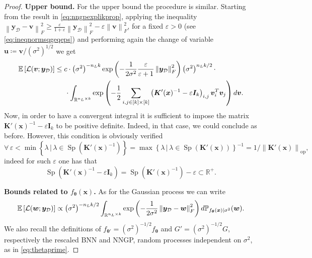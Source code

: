 \documentclass[a4paper, 11pt, reqno]{amsart}
\theoremstyle{plain}
\theoremstyle{remark}
\theoremstyle{definition}
\newcommand{\mean}[2][\kern-0.5pt]{\mathbb{E}_{#1}\left[#2\right]}
\newcommand{\given}{\, | \,}
\newcommand{\real}{\mathbb{R}}
\newcommand{\norm}[1]{\left\lVert#1\right\rVert}
\renewcommand{\exp}[1]{\operatorname{exp}\left(#1\right)}
\let\epsilon\varepsilon
\let\oldforall\forall
\renewcommand{\forall}{\oldforall\,}
\newcommand{\blankeq}{\kern14.65pt}
\begin{document}
\begin{proof}
	\textbf{Upper bound.} For the upper bound the procedure is similar.
	Starting from the result in \cref{eq:nngpexplikprop}, applying the inequality $\norm{\bm{y}_{\mathcal{D}} - \bm{v}}_F^2 \geq \frac{\epsilon}{1 + \epsilon} \norm{\bm{y}_{\mathcal{D}}}_F^2 - \epsilon \norm{\bm{v}}_F^2$, for a fixed $\epsilon > 0$ (see \cref{eq:ineqnormsqgeqeps}) and performing again the change of variable $\bm{u} \coloneqq \bm{v} / (\sigma^2)^{1/2}$ we get
	\begin{align*}
		\mean{\mathcal{L}(\bm{v}; \bm{y}_{\mathcal{D}})} & \leq c \cdot \left(\sigma^2\right)^{- n_L k} \exp{-\frac{1}{2 \sigma^2} \frac{\epsilon}{\epsilon + 1} \norm{\bm{y}_{\mathcal{D}}}_F^2} \left(\sigma^2\right)^{n_L k /2} \cdot \\
		& \blankeq \cdot \int_{\real^{n_L \times k}} \exp{-\frac{1}{2} \sum_{i, j \in [k] \times [k]} \left(\bm{K}'(\bm{x})^{-1} - \epsilon \bm{I}_k\right)_{i, j} \bm{v}_i^T \bm{v}_j} d\bm{v}.
	\end{align*}
	Now, in order to have a convergent integral it is sufficient to impose the matrix $\bm{K}'(\bm{x})^{-1} - \epsilon \bm{I}_k$ to be positive definite. Indeed, in that case, we could conclude as before. 
	However, this condition is obviously verified 
	\begin{equation*}
		\forall \epsilon < \min\left\{\lambda \given \lambda \in \operatorname{Sp}\left(\bm{K}'(\bm{x})^{-1}\right)\right\} = \max\left\{\lambda \given \lambda \in \operatorname{Sp}\left(\bm{K}'(\bm{x})\right)\right\}^{-1} = 1/\norm{\bm{K}'(\bm{x})}_{\mathrm{op}},
	\end{equation*}
	indeed for such $\epsilon$ one has that 
	\begin{equation*}
		\operatorname{Sp}\left(\bm{K}'(\bm{x})^{-1} - \epsilon \bm{I}_k\right) = \operatorname{Sp}\left(\bm{K}'(\bm{x})^{-1}\right) - \epsilon \subset \real^+.
	\end{equation*}
	
	\textbf{Bounds related to $f_{\bm{\theta}}(\bm{x})$.} As for the Gaussian process we can write 
	\begin{equation} \label{eq:nnexplikelihood}
		\mean{\mathcal{L}(\bm{w}; \bm{y}_{\mathcal{D}})} \propto \left(\sigma^2\right)^{- n_L k / 2} \int_{\real^{n_L \times k}} \exp{-\frac{1}{2\sigma^2} \norm{\bm{y}_{\mathcal{D}} - \bm{w}}_F^2} d \mathbb{P}_{f_{\bm{\theta}}(\bm{x}) | \sigma^2}(\bm{w}).
	\end{equation}
	We also recall the definitions of $f_{\bm{\theta}'} = (\sigma^2)^{-1/2} f_{\bm{\theta}}$ and $G' = (\sigma^2)^{-1/2} G$, respectively the rescaled BNN and NNGP, random processes independent on $\sigma^2$, as in \cref{eq:thetaprime}.


\end{proof}
\end{document}
